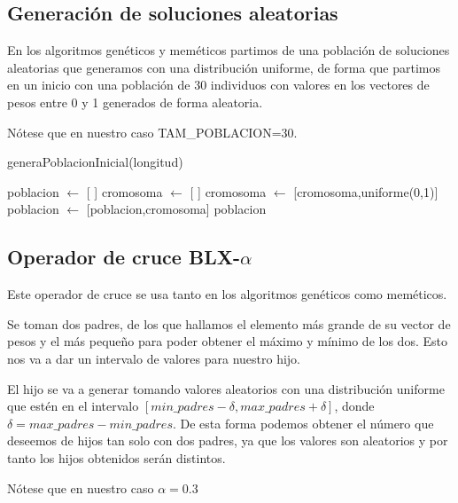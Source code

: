 \documentclass[12pt,a4paper]{article}
\begin{document}
	\subsection{Generación de soluciones aleatorias}

	En los algoritmos genéticos y meméticos partimos de una población de soluciones aleatorias que generamos con una distribución uniforme, de forma que partimos en un inicio con una población de 30 individuos con valores en los vectores de pesos entre 0 y 1 generados de forma aleatoria.

	Nótese que en nuestro caso TAM\_POBLACION=30.

	\begin{algorithm}
		\caption{generaPoblacionInicial(longitud)}
		\begin{algorithmic}
			\STATE poblacion $\leftarrow$ [ ]
				\STATE cromosoma $\leftarrow$ [ ]
					\STATE cromosoma $\leftarrow$ [cromosoma,uniforme(0,1)]
				\ENDFOR
				\STATE poblacion $\leftarrow$ [poblacion,cromosoma]
			\ENDFOR
			\RETURN poblacion
		\end{algorithmic}
	\end{algorithm}

	\subsection{Operador de cruce BLX-$\alpha$}

	Este operador de cruce se usa tanto en los algoritmos genéticos como meméticos.

	Se toman dos padres, de los que hallamos el elemento más grande de su vector de pesos y el más pequeño para poder obtener el máximo y mínimo de los dos. Esto nos va a dar un intervalo de valores para nuestro hijo.

	El hijo se va a generar tomando valores aleatorios con una distribución uniforme que estén en el intervalo $[min\_padres - \delta , max\_padres + \delta]$, donde $\delta = max\_padres - min\_padres$. De esta forma podemos obtener el número que deseemos de hijos tan solo con dos padres, ya que los valores son aleatorios y por tanto los hijos obtenidos serán distintos.

	Nótese que en nuestro caso $\alpha=0.3$
\end{document}
